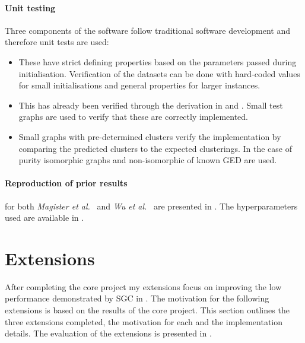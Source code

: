 \paragraph{Unit testing}
Three components of the software follow traditional software development and therefore unit tests are used:
\begin{itemize}
    \item[] 
        These have strict defining properties based on the parameters passed during initialisation.
        Verification of the datasets can be done with hard-coded values for small initialisations and
        general properties for larger instances.
    \item[] 
        This has already been verified through the derivation in  and .
        Small test graphs are used to verify that these are correctly implemented.
    \item[] 
        Small graphs with pre-determined clusters verify the implementation by comparing the predicted clusters to the expected clusterings.
        In the case of purity isomorphic graphs and non-isomorphic of known GED are used.
\end{itemize}

\paragraph{Reproduction of prior results}
for both \textit{Magister et al.}~\cite{magister2021gcexplainer} and \textit{Wu et al.}~\cite{wu2019simplifying} are presented in .
The hyperparameters used are available in .

\section{Extensions}
\label{sec:extensions-imp}
After completing the core project my extensions focus on improving the low performance demonstrated by SGC in .
The motivation for the following extensions is based on the results of the core project.
This section outlines the three extensions completed, the motivation for each and the implementation details.
The evaluation of the extensions is presented in .

